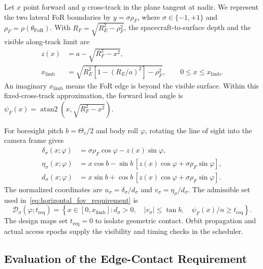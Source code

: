 Let $x$ point forward and $y$ cross-track in the plane tangent at nadir. We represent the two lateral FoR boundaries by $y=\sigma\rho_F$, where $\sigma\in\{-1,+1\}$ and $\rho_F=\rho(\theta_{\mathrm{FoR}})$. With $R_F=\sqrt{R_E^2-\rho_F^2}$, the spacecraft-to-surface depth and the visible along-track limit are
\begin{equation}
\begin{aligned}
z(x)&=a-\sqrt{R_F^2-x^2},\\
x_{\mathrm{limb}}&=\sqrt{R_E^2\left[1-(R_E/a)^2\right]-\rho_F^2},
\qquad 0\leq x\leq x_{\mathrm{limb}}.
\end{aligned}
\label{eq:main_edge_geometry}
\end{equation}
An imaginary $x_{\mathrm{limb}}$ means the FoR edge is beyond the visible surface. Within this fixed-cross-track approximation, the forward lead angle is $\psi_F(x)=\operatorname{atan2}(x,\sqrt{R_F^2-x^2})$.

For boresight pitch $b=\Theta_v/2$ and body roll $\varphi$, rotating the line of sight into the camera frame gives
\begin{equation}
\begin{aligned}
\delta_\sigma(x;\varphi)
&=\sigma\rho_F\cos\varphi-z(x)\sin\varphi,\\
\eta_\sigma(x;\varphi)
&=x\cos b-\sin b\,[z(x)\cos\varphi+\sigma\rho_F\sin\varphi],\\
d_\sigma(x;\varphi)
&=x\sin b+\cos b\,[z(x)\cos\varphi+\sigma\rho_F\sin\varphi].
\end{aligned}
\label{eq:main_detector_projection}
\end{equation}
The normalized coordinates are $u_\sigma=\delta_\sigma/d_\sigma$ and $v_\sigma=\eta_\sigma/d_\sigma$. The admissible set used in~\eqref{eq:horizontal_fov_requirement} is
\begin{equation}
\mathcal{D}_\sigma(\varphi;t_{\mathrm{req}})
=\left\{x\in[0,x_{\mathrm{limb}}]:
d_\sigma>0,\quad |v_\sigma|\leq\tan b,\quad
\psi_F(x)/n\geq t_{\mathrm{req}}\right\}.
\label{eq:admissible_fov_contact}
\end{equation}
The design maps set $t_{\mathrm{req}}=0$ to isolate geometric contact. Orbit propagation and actual access epochs supply the visibility and timing checks in the scheduler.

\subsection{Evaluation of the Edge-Contact Requirement}
\label{sec:appendix_fov_evaluation}

